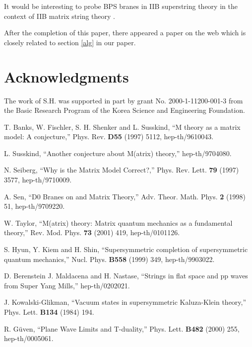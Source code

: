 \documentclass[a4paper,12pt]{article}
\begin{document}
It would be interesting to probe BPS branes in IIB superstring
theory \cite{dab231,ske054} in the context of IIB matrix string
theory \cite{gop174,bon213,ver059}.



After the completion of this paper, there appeared a paper on the
web \cite{sug070} which  is closely related to section \ref{alg}
in our paper.

\section*{Acknowledgments}
 The
work of S.H. was supported in part by grant No. 2000-1-11200-001-3
from the Basic Research Program of the Korea Science and
Engineering Foundation.



\begin{thebibliography}{99}

 T. Banks, W. Fischler, S. H. Shenker and
L. Susskind, ``M theory as a matrix model: A conjecture,''
Phys. Rev. {\bf D55} (1997) 5112, hep-th/9610043.

 L. Susskind, ``Another conjecture about
M(atrix) theory,'' hep-th/9704080.

 N. Seiberg, ``Why is the Matrix Model Correct?,''
Phys. Rev. Lett. {\bf 79} (1997) 3577, hep-th/9710009.

 A. Sen, ``D0 Branes on \coordHE{} and Matrix Theory,''
Adv. Theor. Math. Phys. {\bf 2} (1998) 51, hep-th/9709220.

 W. Taylor, ``M(atrix) theory: Matrix quantum
mechanics as a fundamental theory,'' Rev. Mod. Phys. {\bf 73}
(2001) 419, hep-th/0101126.

 S. Hyun, Y. Kiem and H. Shin, ``Supersymmetric
completion of supersymmetric quantum mechanics,'' Nucl. Phys. {\bf
B558} (1999) 349, hep-th/9903022.

 D. Berenstein J. Maldacena and H. Nastase,
``Strings in flat space and pp waves from \coordHE{} Super
Yang Mills,'' hep-th/0202021.

 J. Kowalski-Glikman, ``Vacuum states in
supersymmetric Kaluza-Klein theory,'' Phys. Lett. {\bf B134}
(1984) 194.

 R. G\"{u}ven, ``Plane Wave Limits and
T-duality,'' Phys. Lett. {\bf B482} (2000) 255, hep-th/0005061.


\end{thebibliography}
\end{document}
